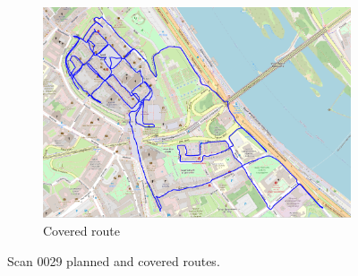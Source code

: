 \documentclass[a4paper,12pt]{book}
\begin{document}
\begin{enumerate}
\begin{figure}[H]
\begin{subfigure}{.95\textwidth}
			\centering
			\includegraphics[width=1\linewidth]{route_c29}
			\caption{Covered route}
			\label{fig:b29}
		\end{subfigure}
		\caption{Scan 0029 planned and covered routes.}
		\label{fig:fig29}
	\end{figure}
\end{enumerate}
\end{document}
